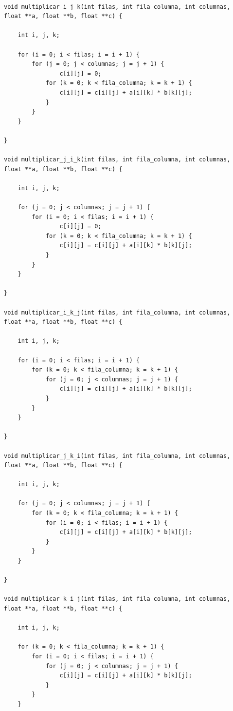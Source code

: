 \documentclass[10pt]{article}
\begin{document}
\begin{lstlisting}

void multiplicar_i_j_k(int filas, int fila_columna, int columnas, float **a, float **b, float **c) {

    int i, j, k;

    for (i = 0; i < filas; i = i + 1) {
        for (j = 0; j < columnas; j = j + 1) {
                c[i][j] = 0; 
            for (k = 0; k < fila_columna; k = k + 1) {
                c[i][j] = c[i][j] + a[i][k] * b[k][j];
            }
        }
    }

}

void multiplicar_j_i_k(int filas, int fila_columna, int columnas, float **a, float **b, float **c) {

    int i, j, k;

    for (j = 0; j < columnas; j = j + 1) {
        for (i = 0; i < filas; i = i + 1) {
                c[i][j] = 0; 
            for (k = 0; k < fila_columna; k = k + 1) {
                c[i][j] = c[i][j] + a[i][k] * b[k][j];
            }
        }
    }

}

void multiplicar_i_k_j(int filas, int fila_columna, int columnas, float **a, float **b, float **c) {

    int i, j, k;

    for (i = 0; i < filas; i = i + 1) {
        for (k = 0; k < fila_columna; k = k + 1) {
            for (j = 0; j < columnas; j = j + 1) {
                c[i][j] = c[i][j] + a[i][k] * b[k][j];
            }
        }
    }

}

void multiplicar_j_k_i(int filas, int fila_columna, int columnas, float **a, float **b, float **c) {

    int i, j, k;

    for (j = 0; j < columnas; j = j + 1) {
        for (k = 0; k < fila_columna; k = k + 1) {
            for (i = 0; i < filas; i = i + 1) {
                c[i][j] = c[i][j] + a[i][k] * b[k][j];
            }
        }
    }

}

void multiplicar_k_i_j(int filas, int fila_columna, int columnas, float **a, float **b, float **c) {

    int i, j, k;

    for (k = 0; k < fila_columna; k = k + 1) {
        for (i = 0; i < filas; i = i + 1) {
            for (j = 0; j < columnas; j = j + 1) {
                c[i][j] = c[i][j] + a[i][k] * b[k][j];
            }
        }
    }


\end{lstlisting}
\end{document}
